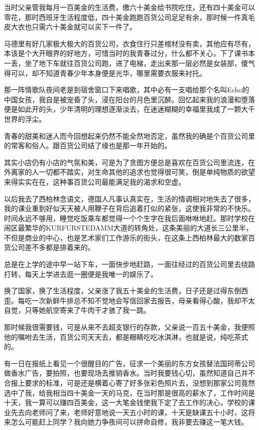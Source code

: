 \par 当时父亲管我每月一百美金的生活费，缴六十美金给书院吃住，还有四十美金可以零花，那时西班牙生活程度低，四十美金跑跑百货公司足足有余，那时候一件真毛皮大衣也只需六十美金就可以买下一件了。
\par 马德里有好几家极大极大的百货公司，衣食住行只差棺材没有卖，其他应有尽有，本该是个大开眼界的好地方，可惜当时的我青春过分，什么都不关心，下了课书本一丢，坐了地下车就往百货公司跑，进了电梯，走出来那一层必然是女装部，傻气得可以，却不知道青春少年本身便是光华，哪里需要衣服来衬托。
\par 那一阵情歌队夜间老是到宿舍窗口下来唱歌，其中必有一支唱给那个名叫Echo的中国女孩，我自是被宠昏了头，浸在阳台的月色里沉醉。回忆起来我的浪漫和堕落便是如此开的头，少年清明的理想逐渐淡去，在迷迷糊糊的幸福里我成了一颗大千世界的浮尘。
\par 青春的甜美和迷人而今回想起来仍然不能全然地否定，虽然我的确是个百货公司里的常客和俗人。跟百货公司结了缘也是那一年开始的。
\par 其实小店仍有小店的气氛和美，可是为了贪图方便总是喜欢在百货公司里流连，在外离家的人一切都不踏实，对生命其他的追求也觉得很可笑，倒是单纯物质的欲望来得实实在在，这种事百货公司最能满足我的渴求和空虚。
\par 以后我去了西柏林念语文，德国人凡事认真实在，生活的情调相对地失去了很多，我的课业重到好似天天被人用鞭子在背后追着打似的紧张，这使我非常的不快乐。时间永远不够用，睡觉吃饭乘车都觉得一个个生字在我后面咻咻地赶。那时学校在闹区最繁华的KURFURSTEDAMM大道的转角处，这条美丽的大道长三公里半，不但是商业的中心，也是艺术家们工作游乐的街头，在这条上西柏林最大的数家百货公司差不多都是排着来的。
\par 总是在上学的途中早一站下车，一面快步地赶路，一面往经过的百货公司里去绕路打转，每天上学进去逛一圈便是我唯一的娱乐了。
\par 换了国家，换了生活程度，父亲涨了我五十美金的生活费，日子还是过得东倒西歪。每吃一次新鲜牛排总不知不觉地会写信回家去报告，母亲看得心酸，我却不太自觉，只等她航空寄来了牛肉干才骇了我一跳。
\par 那时候我很需要钱，可是从来不去超支银行的存款，父亲说一百五十美金，我便照他的嘱咐去生活，百货公司天天去，都是眼睛吃吃冰淇淋，也就是说，纯吃茶式的。
\par 有一日在报纸上看见一个很醒目的广告，征求一个美丽的东方女孩替法国珂蒂公司做香水广告，要拍照，也要现场去推销香水。当时我要钱心切，虽然知道自己并不合报上要求的标准，可是还是横着心寄了好多张彩色照片去，没想到那家公司竟然选中了我，给我相当四十美金一天的马克，在当时那是很高的薪水了，工作时间是十天，我一算可以赚四百美金，这一大笔金钱使我下定了去工作的决心，学校的课业先去向老师问了来，老师好意地说一天五小时的课，十天是缺课五十小时，这将来怎么可能赶上同学？我向她力争夜间可以拼命自修，我非要去赚这一笔大钱。
